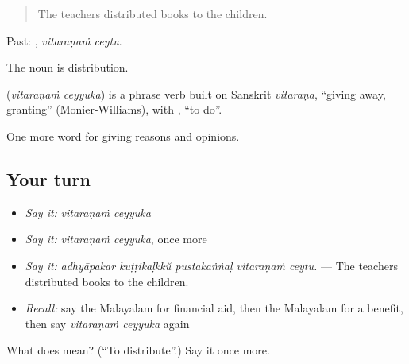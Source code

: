 \begin{quote}
The teachers distributed books to the children.
\end{quote}

Past:  , \emph{vitaraṇaṁ ceytu}.

The noun  is distribution.

\begin{cousinweb}
\textbf{ } (\emph{vitaraṇaṁ ceyyuka}) is a phrase verb built on Sanskrit \emph{vitaraṇa}, \textquotedblleft{}giving away, granting\textquotedblright{} (Monier-Williams), with , \textquotedblleft{}to do\textquotedblright{}.
\end{cousinweb}

\begin{grammarlens}[title={What you've built}]
One more word for giving reasons and opinions.
\end{grammarlens}

\subsection*{Your turn}
\begin{itemize}
\raggedright
  \item \emph{Say it:} \emph{vitaraṇaṁ ceyyuka}
  \item \emph{Say it:} \emph{vitaraṇaṁ ceyyuka}, once more
  \item \emph{Say it:} \emph{adhyāpakar kuṭṭikaḷkkŭ pustakaṅṅaḷ vitaraṇaṁ ceytu.} — The teachers distributed books to the children.
  \item \emph{Recall:} say the Malayalam for financial aid, then the Malayalam for a benefit, then say \emph{vitaraṇaṁ ceyyuka} again
\end{itemize}

\begin{tcolorbox}[breakable,colback=teal!4,colframe=teal!35!black,title={Before you move on}]
What does   mean? (\textquotedblleft{}To distribute\textquotedblright{}.) Say it once more.
\end{tcolorbox}
